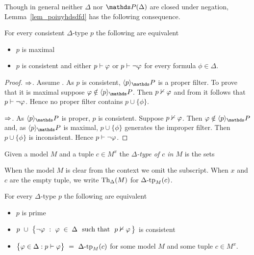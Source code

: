 Though in general neither $\Delta$ nor $\PP(\Delta)$ are closed under negation, Lemma~\ref{lem_poiuyhdsdfd} has the following consequence.

\begin{proposition}\label{prop_test_completezza}
For every consistent $\Delta$-type $p$ the following are equivalent
\begin{itemize}
\item[1.] $p$ is maximal
\item[2.] $p$ is consistent and either $p\vdash\varphi$ or $p\vdash\neg\varphi$ for every formula $\phi\in\Delta$.
\end{itemize}
\end{proposition}
\begin{proof}
$\Rightarrow$.
Assume .
As $p$ is consistent, $\<p\>_\PP$ is a proper filter.
To prove that it is maximal suppose $\phi\notin\<p\>_\PP$.
Then $p\nvdash\varphi$ and from  it follows that  $p\vdash\neg\varphi$.
Hence no proper filter contains $p\cup\{\phi\}$.

$\Rightarrow$.
As $\<p\>_\PP$ is proper, $p$ is consistent.
Suppose $p\nvdash\varphi$.
Then $\phi\notin\<p\>_\PP$ and, as $\<p\>_\PP$ is maximal, $p\cup\{\phi\}$ generates the improper filter.
Then $p\cup\{\phi\}$ is inconsistent.
Hence $p\vdash\neg\varphi$.
\end{proof}

Given a model $M$ and a tuple $c\in M^{x}$ the \emph{$\Delta$-type of $c$ in $M$\/} is the sets


When the model $M$ is clear from the context we omit the subscript.
When $x$ and $c$ are the empty tuple, we write \emph{${\rm Th}_\Delta(M)$} for $\Delta\mbox{\rm -tp}_M(c)$.

\begin{lemma}\label{lemmatipiprimiconsistenti}
For every $\Delta$-type $p$ the following are equivalent
\begin{itemize}
\item[1.] $p$ is prime
\item[2.] $p\ \cup\ \big\{\neg\phi\ :\  \phi\;\in\;\Delta\ \ \textrm{such that}\ \ p\notproves\phi\, \big\}$ is consistent
\item[3.] $\big\{\varphi\in\Delta : p\vdash\varphi\big\}\ = \ \Delta\mbox{\rm -tp}_M(c)$ for some model $M$ and some tuple $c\in M^{x}$.
\end{itemize}
\end{lemma}

